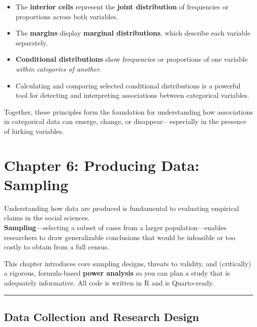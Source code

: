 \documentclass[
  letterpaper,
  DIV=11,
  numbers=noendperiod]{scrreprt}
\providecommand{\tightlist}{%
  \setlength{\itemsep}{0pt}\setlength{\parskip}{0pt}}
\begin{document}
\begin{itemize}
\tightlist
\item
  The \textbf{interior cells} represent the \textbf{joint distribution}
  of frequencies or proportions across both variables.\\
\item
  The \textbf{margins} display \textbf{marginal distributions}, which
  describe each variable separately.\\
\item
  \textbf{Conditional distributions} show frequencies or proportions of
  one variable \emph{within categories of another}.\\
\item
  Calculating and comparing selected conditional distributions is a
  powerful tool for detecting and interpreting associations between
  categorical variables.
\end{itemize}

Together, these principles form the foundation for understanding how
associations in categorical data can emerge, change, or
disappear---especially in the presence of lurking variables.


\chapter{Chapter 6: Producing Data:
Sampling}\label{chapter-6-producing-data-sampling}

Understanding how data are produced is fundamental to evaluating
empirical claims in the social sciences.\\
\textbf{Sampling}---selecting a subset of cases from a larger
population---enables researchers to draw generalizable conclusions that
would be infeasible or too costly to obtain from a full census.

This chapter introduces core sampling designs, threats to validity, and
(critically) a rigorous, formula-based \textbf{power analysis} so you
can plan a study that is adequately informative. All code is written in
R and is Quarto-ready.

\begin{center}\rule{0.5\linewidth}{0.5pt}\end{center}

\section{Data Collection and Research
Design}\label{data-collection-and-research-design}
\end{document}
